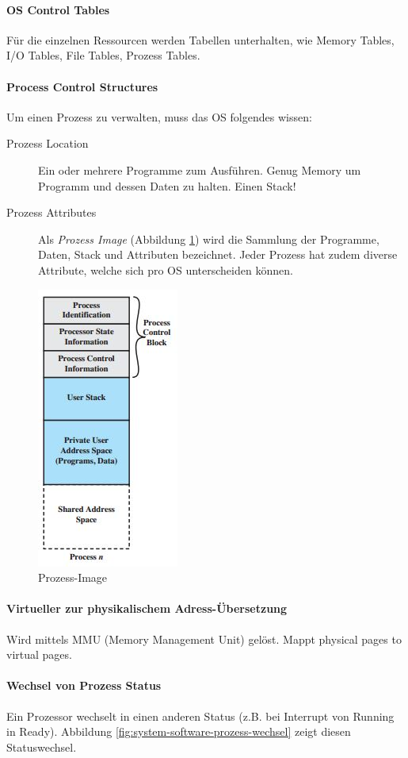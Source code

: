 \paragraph{OS Control Tables} Für die einzelnen Ressourcen werden Tabellen unterhalten, wie Memory Tables, I/O Tables, File Tables, Prozess Tables.

\paragraph{Process Control Structures}
Um einen Prozess zu verwalten, muss das OS folgendes wissen:
\begin{description}
	\item[Prozess Location] Ein oder mehrere Programme zum Ausführen. Genug Memory um Programm und dessen Daten zu halten. Einen Stack!
	\item[Prozess Attributes] Als \emph{Prozess Image} (Abbildung \ref{fig:system-software-prozess-image}) wird die Sammlung der Programme, Daten, Stack und Attributen bezeichnet. Jeder Prozess hat zudem diverse Attribute, welche sich pro OS unterscheiden können.
\end{description}

\begin{figure}[h!]
	\centering
	\includegraphics[width=0.2\linewidth]{fig/system-software-prozess-image}
	\caption{Prozess-Image}
	\label{fig:system-software-prozess-image}
\end{figure}

\paragraph{Virtueller zur physikalischem Adress-Übersetzung}
Wird mittels MMU (Memory Management Unit) gelöst. Mappt physical pages to virtual pages. \\

\paragraph{Wechsel von Prozess Status}
Ein Prozessor wechselt in einen anderen Status (z.B. bei Interrupt von Running in Ready). Abbildung \ref{fig:system-software-prozess-wechsel} zeigt diesen Statuswechsel.

